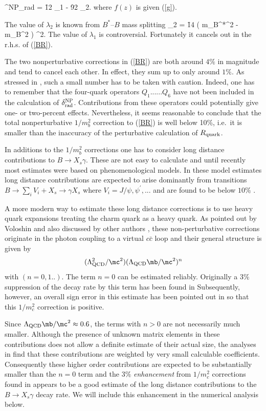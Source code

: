 \be
\delta^{{\rm NP}}_{{\rm rad}}  = \f{1}{2} \lambda_1 - \f{9}{2} \lambda_2.
\ee
where $f(z)$ is given (\ref{g}).

The value of $\lambda_2$ is known from $B^*$--$B$ mass splitting
%
\be
\lambda_2 = \f{1}{4} ( m_{B^*}^2 - m_B^2 ) ^2.
\ee
%
The value of $\lambda_1$ is controversial. Fortunately it cancels out
in the r.h.s. of (\ref{BR}).

The two nonperturbative corrections in (\ref{BR}) are
both around $4\%$ in magnitude and tend to cancel each other. In
effect, they sum up to only around $1\%$. As stressed in \cite{CZMM},
such a small number has
to be taken with caution. 
Indeed, one has to remember that the four-quark operators 
$Q_1...... Q_6$ have not been included in the calculation of
$\delta^{{\rm NP}}_{{\rm rad}}$. Contributions from these operators could
potentially give one- or two-percent effects. Nevertheless, it seems
reasonable to conclude that the total nonperturbative $1/m_b^2$ 
correction to
(\ref{BR}) is well below 10\%, i.e.\ it is smaller than the
inaccuracy of the perturbative calculation of $R_{{\rm quark}}$.

In additions to the $1/m_b^2$ corrections one has to consider
long distance contributions to $B\to X_s\gamma$. These are not easy
to calculate and until recently most estimates were based on phenomenological
models. In these model estimates long distance contributions 
are expected to arise dominantly 
from transitions $B \to \sum_i V_i+X_s \to \gamma X_s$ where
$V_i=J/\psi,\psi^\prime,...$ and are found  to be below
$10\%$ \cite{LDGAMMA}. 

A more modern way to estimate these long distance corrections
is to use heavy quark expansions treating the charm quark as
a heavy quark. As pointed out
by Voloshin \cite{VOL96} and also discussed by other
authors \cite{LRW97}, 
these non-perturbative corrections
originate in the photon coupling to a virtual $c\bar c$ loop and
their general structure is given by 
$$
(\Lambda_{\rm QCD}^2/\mc^2)(\Lambda_{\rm QCD}\mb/\mc^2)^n
$$
with $(n=0,1..)$. The term $n=0$ can be estimated reliably.
Originally a 3\% suppression of the decay rate by this term has been
found  in \cite{VOL96} 
Subsequently, however, an overall sign error 
in this estimate has been pointed out in \cite{BUC97} so that this
$1/m_c^2$ correction  is positive. 

Since
$\Lambda_{\rm QCD}\mb/\mc^2\approx 0.6 $, the terms with $n>0$
are not necessarily much smaller. Although the presence of
unknown matrix elements in these contributions does not
allow a definite estimate of their actual size, the analyses in
\cite{VOL96,LRW97} find that these contributions are weighted by
very small calculable coefficients. Consequently these higher order 
contributions
are expected to be  substantially smaller than the $n=0$ term 
and  the $3\%$ {\it enhancement} from $1/m_c^2$ corrections found in
\cite{BUC97} appears to be a good estimate of the long distance 
contributions to the $B\rightarrow X_s\gamma$ decay rate. 
We will include this enhancement in the numerical analysis below.

